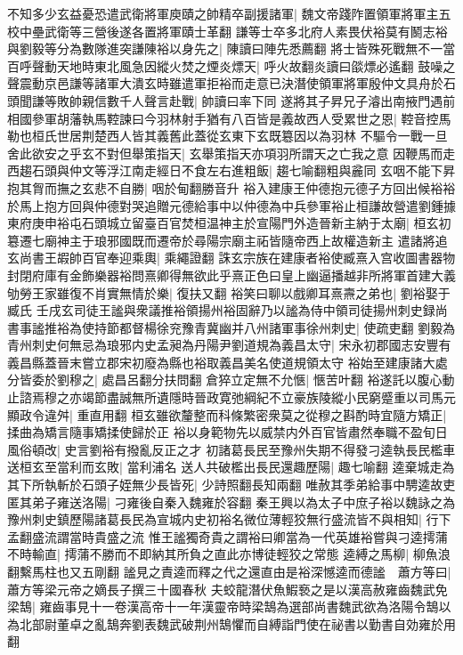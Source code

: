 不知多少玄益憂恐遣武衛將軍庾賾之帥精卒副援諸軍|{
	魏文帝踐阼置領軍將軍主五校中壘武衛等三營後遂各置將軍賾士革翻}
謙等士卒多北府人素畏伏裕莫有鬭志裕與劉毅等分為數隊進突謙陳裕以身先之|{
	陳讀曰陣先悉薦翻}
將士皆殊死戰無不一當百呼聲動天地時東北風急因縱火焚之煙炎熛天|{
	呼火故翻炎讀曰燄熛必遙翻}
鼓噪之聲震動京邑謙等諸軍大潰玄時雖遣軍拒裕而走意已決潛使領軍將軍殷仲文具舟於石頭聞謙等敗帥親信數千人聲言赴戰|{
	帥讀曰率下同}
遂將其子昇兄子濬出南掖門遇前相國參軍胡藩執馬鞚諫曰今羽林射手猶有八百皆是義故西人受累世之恩|{
	鞚音控馬勒也桓氏世居荆楚西人皆其義舊此蓋從玄東下玄既簒因以為羽林}
不驅令一戰一旦舍此欲安之乎玄不對但舉策指天|{
	玄舉策指天亦項羽所謂天之亡我之意}
因鞭馬而走西趨石頭與仲文等浮江南走經日不食左右進粗飯|{
	趨七喻翻粗與麄同}
玄咽不能下昇抱其胷而撫之玄悲不自勝|{
	咽於甸翻勝音升}
裕入建康王仲德抱元德子方回出候裕裕於馬上抱方回與仲德對哭追贈元德給事中以仲德為中兵參軍裕止桓謙故營遣劉鍾據東府庚申裕屯石頭城立留臺百官焚桓温神主於宣陽門外造晉新主納于太廟|{
	桓玄初簒遷七廟神主于琅邪國既而遷帝於尋陽宗廟主祏皆隨帝西上故權造新主}
遣諸將追玄尚書王嘏帥百官奉迎乘輿|{
	乘繩證翻}
誅玄宗族在建康者裕使臧熹入宫收圖書器物封閉府庫有金飾樂器裕問熹卿得無欲此乎熹正色曰皇上幽逼播越非所將軍首建大義劬勞王家雖復不肖實無情於樂|{
	復扶又翻}
裕笑曰聊以戲卿耳熹燾之弟也|{
	劉裕娶于臧氏}
壬戌玄司徒王謐與衆議推裕領揚州裕固辭乃以謐為侍中領司徒揚州刺史録尚書事謐推裕為使持節都督楊徐兖豫青冀幽并八州諸軍事徐州刺史|{
	使疏吏翻}
劉毅為青州刺史何無忌為琅邪内史孟昶為丹陽尹劉道規為義昌太守|{
	宋永初郡國志安豐有義昌縣蓋晉末嘗立郡宋初廢為縣也裕取義昌美名使道規領太守}
裕始至建康諸大處分皆委於劉穆之|{
	處昌呂翻分扶問翻}
倉猝立定無不允愜|{
	愜苦叶翻}
裕遂託以腹心動止諮焉穆之亦竭節盡誠無所遺隱時晉政寛弛綱紀不立豪族陵縱小民窮蹙重以司馬元顯政令違舛|{
	重直用翻}
桓玄雖欲釐整而科條繁密衆莫之從穆之斟酌時宜隨方矯正|{
	揉曲為矯言隨事矯揉使歸於正}
裕以身範物先以威禁内外百官皆肅然奉職不盈旬日風俗頓改|{
	史言劉裕有撥亂反正之才}
初諸葛長民至豫州失期不得發刁逵執長民檻車送桓玄至當利而玄敗|{
	當利浦名}
送人共破檻出長民還趣歷陽|{
	趣七喻翻}
逵棄城走為其下所執斬於石頭子姪無少長皆死|{
	少詩照翻長知兩翻}
唯赦其季弟給事中騁逵故吏匿其弟子雍送洛陽|{
	刁雍後自秦入魏雍於容翻}
秦王興以為太子中庶子裕以魏詠之為豫州刺史鎮歷陽諸葛長民為宣城内史初裕名微位薄輕狡無行盛流皆不與相知|{
	行下孟翻盛流謂當時貴盛之流}
惟王謐獨奇貴之謂裕曰卿當為一代英雄裕嘗與刁逵摴蒲不時輸直|{
	摴蒲不勝而不即納其所負之直此亦博徒輕狡之常態}
逵縛之馬柳|{
	柳魚浪翻繫馬柱也又五剛翻}
謐見之責逵而釋之代之還直由是裕深憾逵而德謐　蕭方等曰|{
	蕭方等梁元帝之嫡長子撰三十國春秋}
夫蛟龍潛伏魚鰕䙝之是以漢高赦雍齒魏武免梁鵠|{
	雍齒事見十一卷漢高帝十一年漢靈帝時梁鵠為選部尚書魏武欲為洛陽令鵠以為北部尉董卓之亂鵠奔劉表魏武破荆州鵠懼而自縛詣門使在祕書以勤書自効雍於用翻}
